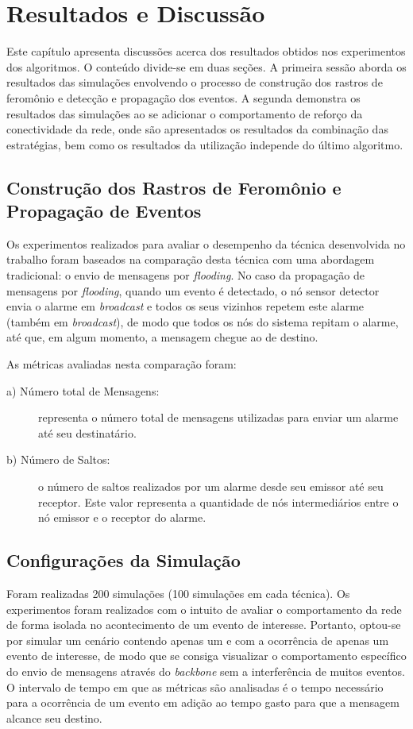 \section{Resultados e Discussão}
Este capítulo apresenta discussões acerca dos resultados obtidos nos experimentos dos algoritmos. O conteúdo divide-se em duas seções. A primeira sessão aborda os resultados das simulações envolvendo o processo de construção dos rastros de feromônio e detecção e propagação dos eventos. A segunda demonstra os resultados das simulações ao se adicionar o comportamento de reforço da conectividade da rede, onde são apresentados os resultados da combinação das estratégias, bem como os resultados da utilização independe do último algoritmo.

\subsection{Construção dos Rastros de Feromônio e Propagação de Eventos}
Os experimentos realizados para avaliar o desempenho da técnica desenvolvida no trabalho foram baseados na comparação desta técnica com uma abordagem tradicional: o envio de mensagens por \emph{flooding}. No caso da propagação de mensagens por \emph{flooding}, quando um evento é detectado, o nó sensor detector envia o alarme em \emph{broadcast} e todos os seus vizinhos repetem este alarme (também em \emph{broadcast}), de modo que todos os nós do sistema repitam o alarme, até que, em algum momento, a mensagem chegue ao \vant de destino.

As métricas avaliadas nesta comparação foram:

\begin{description}
\item[a) Número total de Mensagens: ] representa o número total de mensagens utilizadas para enviar um alarme até seu destinatário.
\item[b) Número de Saltos:] o número de saltos realizados por um alarme desde seu emissor até seu receptor. Este valor representa a quantidade de nós intermediários entre o nó emissor e o \vant receptor do alarme.
\end{description}

\subsection{Configurações da Simulação}
Foram realizadas 200 simulações (100 simulações em cada técnica). Os experimentos foram realizados com o intuito de avaliar o comportamento da rede de forma isolada no acontecimento de um evento de interesse. Portanto, optou-se por simular um cenário contendo apenas um \vant e com a ocorrência de apenas um evento de interesse, de modo que se consiga visualizar o comportamento específico do envio de mensagens através do \emph{backbone} sem a interferência de muitos eventos. O intervalo de tempo em que as métricas são analisadas é o tempo necessário para a ocorrência de um evento em adição ao tempo gasto para que a mensagem alcance seu destino.

